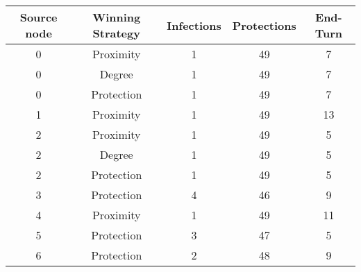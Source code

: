 \documentclass[results.tex]{subfiles}
\begin{document}
    \begin{center}
        \begin{tabular}{| c || c | c | c | c |}
            \hline
            {\bfseries Source node} & {\bfseries Winning Strategy} & {\bfseries Infections} & {\bfseries Protections}
            & {\bfseries End-Turn}
            \\  %
            \hline\hline
            0                       & Proximity                    & 1                      & 49                      & 7                    \\
            \hline
            0                       & Degree                       & 1                      & 49                      & 7                    \\
            \hline
            0                       & Protection                   & 1                      & 49                      & 7                    \\
            \hline
            1                       & Proximity                    & 1                      & 49                      & 13                   \\
            \hline
            2                       & Proximity                    & 1                      & 49                      & 5                    \\
            \hline
            2                       & Degree                       & 1                      & 49                      & 5                    \\
            \hline
            2                       & Protection                   & 1                      & 49                      & 5                    \\
            \hline
            3                       & Protection                   & 4                      & 46                      & 9                    \\
            \hline
            4                       & Proximity                    & 1                      & 49                      & 11                   \\
            \hline
            5                       & Protection                   & 3                      & 47                      & 5                    \\
            \hline
            6                       & Protection                   & 2                      & 48                      & 9                    \\

\end{tabular}
\end{center}
\end{document}
